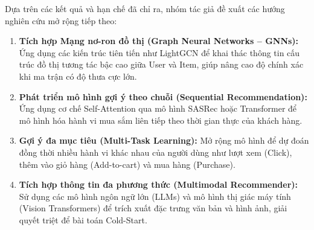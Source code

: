 Dựa trên các kết quả và hạn chế đã chỉ ra, nhóm tác giả đề xuất các hướng nghiên cứu mở rộng tiếp theo:
\begin{enumerate}
    \item \textbf{Tích hợp Mạng nơ-ron đồ thị (Graph Neural Networks -- GNNs):} Ứng dụng các kiến trúc tiên tiến như LightGCN \parencite{he2020lightgcn} để khai thác thông tin cấu trúc đồ thị tương tác bậc cao giữa User và Item, giúp nâng cao độ chính xác khi ma trận có độ thưa cực lớn.
    
    \item \textbf{Phát triển mô hình gợi ý theo chuỗi (Sequential Recommendation):} Ứng dụng cơ chế Self-Attention qua mô hình SASRec \parencite{kang2018self} hoặc Transformer để mô hình hóa hành vi mua sắm liên tiếp theo thời gian thực của khách hàng.
    
    \item \textbf{Gợi ý đa mục tiêu (Multi-Task Learning):} Mở rộng mô hình để dự đoán đồng thời nhiều hành vi khác nhau của người dùng như lượt xem (Click), thêm vào giỏ hàng (Add-to-cart) và mua hàng (Purchase).
    
    \item \textbf{Tích hợp thông tin đa phương thức (Multimodal Recommender):} Sử dụng các mô hình ngôn ngữ lớn (LLMs) và mô hình thị giác máy tính (Vision Transformers) để trích xuất đặc trưng văn bản và hình ảnh, giải quyết triệt để bài toán Cold-Start.
\end{enumerate}
